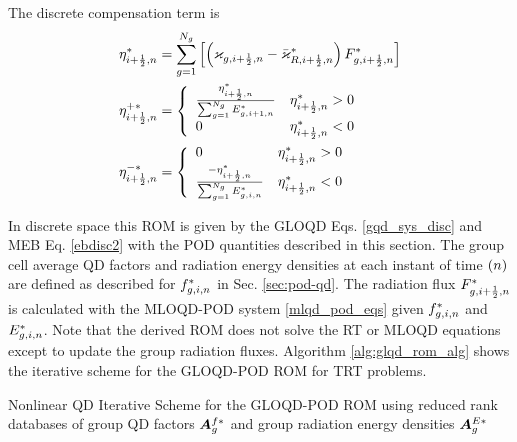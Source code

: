 	The discrete compensation term is
	\begin{subequations}
		\begin{align}
			&\eta_{i+\frac{1}{2},n}^* = \sum_{g=1}^{N_g} \left[\left(\varkappa_{g,i+\frac{1}{2},n} - \bar{\varkappa}_{R,i+\frac{1}{2},n}^*\right)F_{g,i+\frac{1}{2},n}^*\right]\\
			&\eta_{i+\frac{1}{2},n}^{+*} = \left\{ \begin{array}{ll}
						\frac{\eta_{i+\frac{1}{2},n}^*}{\sum_{g=1}^{N_g} E_{g,i+1,n}^*} & \eta_{i+\frac{1}{2},n}^*>0\\
						0 & \eta_{i+\frac{1}{2},n}^*<0
					\end{array} \right.\\
			&\eta_{i+\frac{1}{2},n}^{-*} = \left\{ \begin{array}{ll}
						0 & \eta_{i+\frac{1}{2},n}^*>0\\
						\frac{-\eta_{i+\frac{1}{2},n}^*}{\sum_{g=1}^{N_g} E_{g,i,n}^*} & \eta_{i+\frac{1}{2},n}^*<0
					\end{array} \right.
		\end{align}
	\end{subequations}
	\fi
	
	In discrete space this ROM is given by the GLOQD Eqs. \eqref{gqd_sys_disc} and MEB Eq. \eqref{ebdisc2} with the POD quantities described in this section. The group cell average QD factors and radiation energy densities at each instant of time $\left( n\right)$ are defined as described for $f_{g,i,n}^*$ in Sec. \ref{sec:pod-qd}. The radiation flux $F_{g,i+\frac{1}{2},n}^*$ is calculated with the MLOQD-POD system \eqref{mlqd_pod_eqs} given $f_{g,i,n}^*$ and $E_{g,i,n}^*$. Note that the derived ROM does not solve the RT or MLOQD equations except to update the group radiation fluxes. Algorithm \ref{alg:glqd_rom_alg} shows the iterative scheme for the GLOQD-POD ROM for TRT problems.
	
	\begin{algorithm}[ht!]
		\SetAlgoLined
		\caption{Nonlinear QD Iterative Scheme for the GLOQD-POD ROM using reduced rank databases of group QD factors $\bm{A}^{f*}_g$ and group radiation energy densities $\bm{A}^{E*}_g$ \label{alg:glqd_rom_alg}}
	\end{algorithm}
	
